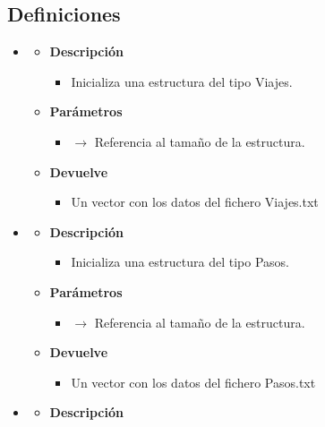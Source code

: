 \subsection{Definiciones}
\begin{itemize}
    \item {}
    \begin{itemize}
        \item \textbf{Descripción}
        \begin{itemize}
			\item Inicializa una estructura del tipo Viajes.
		\end{itemize}
		\item \textbf{Parámetros}
		\begin{itemize}
			\item {} $\rightarrow$ Referencia al tamaño de la estructura.
		\end{itemize}
		\item \textbf{Devuelve}
		\begin{itemize}
			\item Un vector con los datos del fichero Viajes.txt
		\end{itemize}
	\end{itemize}
    \item {}
    \begin{itemize}
        \item \textbf{Descripción}
        \begin{itemize}
			\item Inicializa una estructura del tipo Pasos.
		\end{itemize}
		\item \textbf{Parámetros}
		\begin{itemize}
			\item {} $\rightarrow$ Referencia al tamaño de la estructura.
		\end{itemize}
		\item \textbf{Devuelve}
		\begin{itemize}
			\item Un vector con los datos del fichero Pasos.txt
		\end{itemize}
	\end{itemize}
    \item {}
    \begin{itemize}
        \item \textbf{Descripción}
        \begin{itemize}

\end{itemize}
\end{itemize}
\end{itemize}
